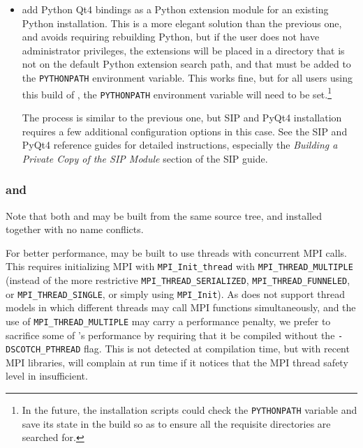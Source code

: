 \documentclass[a4paper,10pt,twoside]{csshortdoc}
\begin{document}
\begin{itemize}
\item add Python Qt4 bindings as a Python extension module for an existing
      Python installation. This is a more elegant solution than the previous
      one, and avoids requiring rebuilding Python, but if the user does not
      have administrator privileges, the extensions will be placed in a
      directory that is not on the default Python extension search path, and
      that must be added to the \texttt{PYTHONPATH} environment variable.
      This works fine, but for all users using this build of \CS, the
      \texttt{PYTHONPATH} environment variable will need to be
      set.\footnote{In the future, the \CS installation scripts could check
      the \texttt{PYTHONPATH} variable and save its state in the build so as
      to ensure all the requisite directories are searched for.}

      The process is similar to the previous one, but SIP and PyQt4
      installation requires a few additional configuration options
      in this case. See the SIP and PyQt4 reference guides for
      detailed instructions, especially the \emph{Building a Private
      Copy of the SIP Module} section of the SIP guide.

\end{itemize}

\subsubsection{\scotch and \ptscotch\label{sec:ext:scotch}}

Note that both \scotch and \ptscotch may be built from the same source
tree, and installed together with no name conflicts.

For better performance, \ptscotch may be built to use threads with concurrent
MPI calls. This requires initializing MPI with \texttt{MPI\_Init\_thread}
with \texttt{MPI\_THREAD\_MULTIPLE} (instead of the more restrictive
\texttt{MPI\_THREAD\_SERIALIZED}, \texttt{MPI\_THREAD\_FUNNELED}, or
\texttt{MPI\_THREAD\_SINGLE}, or simply using \texttt{MPI\_Init}).
As \CS does not support thread models in which different threads may call
MPI functions simultaneously, and the use of \texttt{MPI\_THREAD\_MULTIPLE}
may carry a performance penalty, we prefer to sacrifice some of
\ptscotch's performance by requiring that it be compiled without the
\texttt{-DSCOTCH\_PTHREAD} flag. This is not detected at compilation time,
but with recent MPI libraries, \ptscotch will complain at run time
if it notices that the MPI thread safety level in insufficient.
\end{document}
